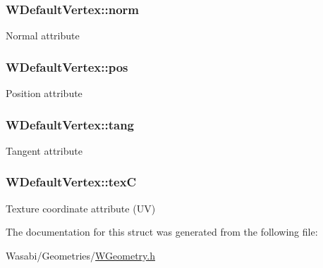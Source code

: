 \subsubsection[{\texorpdfstring{norm}{norm}}]{ W\+Default\+Vertex\+::norm}\hypertarget{struct_w_default_vertex_a60a322ede7963e1e4a3f6e031c303ffa}{}\label{struct_w_default_vertex_a60a322ede7963e1e4a3f6e031c303ffa}
Normal attribute 
\subsubsection[{\texorpdfstring{pos}{pos}}]{ W\+Default\+Vertex\+::pos}\hypertarget{struct_w_default_vertex_afdcf7f42cc5581df2f6952aaf839e8bb}{}\label{struct_w_default_vertex_afdcf7f42cc5581df2f6952aaf839e8bb}
Position attribute 
\subsubsection[{\texorpdfstring{tang}{tang}}]{ W\+Default\+Vertex\+::tang}\hypertarget{struct_w_default_vertex_a2220549f6c898e6fdc5f534630c44796}{}\label{struct_w_default_vertex_a2220549f6c898e6fdc5f534630c44796}
Tangent attribute 
\subsubsection[{\texorpdfstring{texC}{texC}}]{ W\+Default\+Vertex\+::texC}\hypertarget{struct_w_default_vertex_a3e58deb0c88b8adaa8423aebd8427172}{}\label{struct_w_default_vertex_a3e58deb0c88b8adaa8423aebd8427172}
Texture coordinate attribute (UV) 

The documentation for this struct was generated from the following file\+:\begin{DoxyCompactItemize}
\item 
Wasabi/\+Geometries/\hyperlink{_w_geometry_8h}{W\+Geometry.\+h}\end{DoxyCompactItemize}
